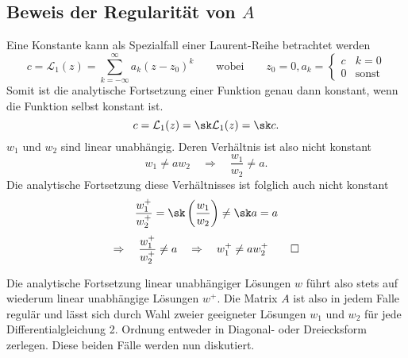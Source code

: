 \subsection{Beweis der Regularität von $A$}
Eine Konstante kann als Spezialfall einer Laurent-Reihe betrachtet werden
\[c = \mathcal{L}_1(z)=\sum_{k=-\infty}^{\infty}a_k(z-z_0)^k\qquad\text{wobei}\qquad  z_0=0, a_k=\begin{cases}
c&k=0\\0&\text{sonst}
\end{cases}\]
Somit ist die analytische Fortsetzung einer Funktion genau dann konstant, wenn die Funktion selbst konstant ist.
\[c = \mathcal{L}_1(z)= \sk \mathcal{L}_1(z) = \sk c.\]
$w_1$ und $w_2$ sind linear unabhängig. Deren Verhältnis ist also nicht konstant
\[w_1\ne a w_2\quad\Rightarrow\quad\frac{w_1}{w_2}\ne a.\]
Die analytische Fortsetzung diese Verhältnisses ist folglich auch nicht konstant
\[\frac{w_1^+}{w_2^+}=\sk \left(\frac{w_1}{w_2}\right) \ne \sk a = a \]
\[\Rightarrow\quad \frac{w_1^+}{w_2^+}\ne a\quad\Rightarrow\quad w_1^+\ne aw_2^+\qed
\]

Die analytische Fortsetzung linear unabhängiger Lösungen $w$ führt also stets auf wiederum linear unabhängige Lösungen $w^+$.
Die Matrix $A$ ist also in jedem Falle regulär und lässt sich durch Wahl zweier geeigneter Lösungen $w_1$ und $w_2$ für jede Differentialgleichung 2. Ordnung entweder in Diagonal- oder Dreiecksform zerlegen.
Diese beiden Fälle werden nun diskutiert.


